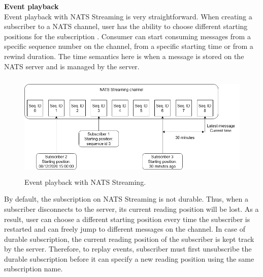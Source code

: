 \textbf{Event playback}\\
Event playback with NATS Streaming is very straightforward. When creating a subscriber to a NATS channel, user has the ability to choose different starting positions for the subscription \cite{natsdevelopingreceivemessage}. Consumer can start consuming messages from a specific sequence number on the channel, from a specific starting time or from a rewind duration. The time semantics here is when a message is stored on the NATS server and is managed by the server.
\begin{figure}[h]
	\centering
	\includegraphics[width=\linewidth,height=5cm]{images/event-playback-nats.png}
	\caption{Event playback with NATS Streaming.}
	\label{fig:natseventplayback}
\end{figure}

By default, the subscription on NATS Streaming is not durable. Thus, when a subscriber disconnects to the server, its current reading position will be lost. As a result, user can choose a different starting position every time the subscriber is restarted and can freely jump to different messages on the channel. In case of durable subscription, the current reading position of the subscriber is kept track by the server. Therefore, to replay events, subscriber must first unsubscribe the durable subscription before it can specify a new reading position using the same subscription name.







